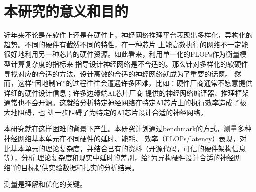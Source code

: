 \section{本研究的意义和目的}

近年来不论是在软件上还是在硬件上，神经网络推理平台表现出多样化，异构化的趋势。不同的硬件有截然不同的特性，在一种芯片
上能高效执行的网络不一定能很好地利用另一种芯片的硬件资源。如此看来，利用单一化的FLOPs作为衡量模型计算复杂度的指标来
指导设计神经网络是不合适的。那么针对多样化的软硬件寻找对应的合适的方法，设计高效的合适的神经网络就成为了重要的话题。
然而，这样“因地制宜”的过程往往会遭遇许多困难，比如：硬件厂商通常不愿意提供详细的硬件设计信息；许多边缘端AI芯片厂商
提供的神经网络编译器、推理框架通常也不会开源。这就给分析特定神经网络在特定AI芯片上的执行效率造成了极大地阻碍，也
进一步阻碍了为特定的AI芯片设计合适的神经网络。

本研究就在这样困难的背景下产生。本研究计划通过benchmark的方式，测量多种神经网络基本单元在不同硬件的延时、能耗、
效率（FLOPs/latency）表现，对比基本单元的理论复杂度，并结合已有的资料（开源代码，可信的硬件架构信息等），分析
理论复杂度和现实中延时的差别，给“为异构硬件设计合适的神经网络”的目标提供实验数据和扎实的分析结果。

测量是理解和优化的关键。

